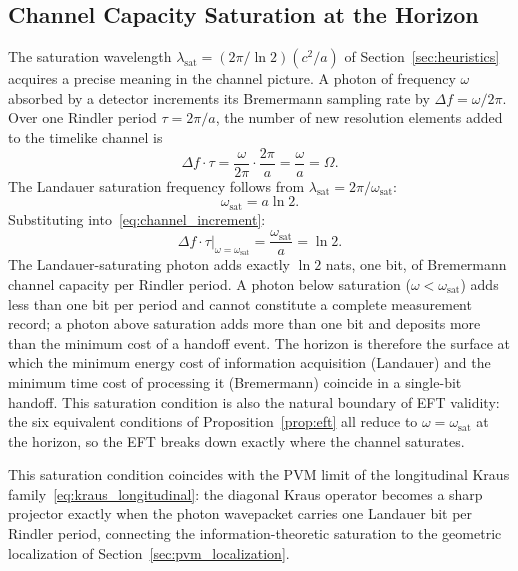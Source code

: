 
\subsection{Channel Capacity Saturation at the Horizon}
\label{sec:saturation}

The saturation wavelength $\lambda_{\mathrm{sat}} = 
(2\pi/\ln 2)(c^2/a)$ of Section~\ref{sec:heuristics} 
acquires a precise meaning in the channel picture. 
A photon of frequency $\omega$ absorbed by a detector 
increments its Bremermann sampling rate by 
$\Delta f = \omega / 2\pi$. Over one Rindler period 
$\tau = 2\pi/a$, the number of new resolution 
elements added to the timelike channel is
%
\begin{equation}
    \Delta f \cdot \tau 
    = \frac{\omega}{2\pi} \cdot \frac{2\pi}{a} 
    = \frac{\omega}{a} = \Omega.
    \label{eq:channel_increment}
\end{equation}
%
The Landauer saturation frequency follows from 
$\lambda_{\mathrm{sat}} = 2\pi / \omega_{\mathrm{sat}}$:
%
\begin{equation}
    \omega_{\mathrm{sat}} = a \ln 2.
\end{equation}
%
Substituting into~\eqref{eq:channel_increment}:
%
\begin{equation}
    \left.\Delta f \cdot \tau\right|_{\omega = 
    \omega_{\mathrm{sat}}} 
    = \frac{\omega_{\mathrm{sat}}}{a} 
    = \ln 2.
    \label{eq:saturation_result}
\end{equation}
%
The Landauer-saturating photon adds exactly $\ln 2$ 
nats, one bit, of Bremermann channel capacity 
per Rindler period. A photon below saturation 
($\omega < \omega_{\mathrm{sat}}$) adds less than one 
bit per period and cannot constitute a complete 
measurement record; a photon above saturation adds 
more than one bit and deposits more than the minimum 
cost of a handoff event. The horizon is therefore the 
surface at which the minimum energy cost of 
information acquisition (Landauer) and the minimum 
time cost of processing it (Bremermann) coincide in 
a single-bit handoff. This saturation condition is 
also the natural boundary of EFT validity: the six 
equivalent conditions of Proposition~\ref{prop:eft} 
all reduce to $\omega = \omega_{\mathrm{sat}}$ at the 
horizon, so the EFT breaks down exactly where the 
channel saturates.

This saturation condition coincides with the 
PVM limit of the longitudinal Kraus 
family~\eqref{eq:kraus_longitudinal}: 
the diagonal Kraus operator becomes a sharp 
projector exactly when the photon wavepacket 
carries one Landauer bit per Rindler period, 
connecting the information-theoretic saturation 
to the geometric localization of 
Section~\ref{sec:pvm_localization}.
